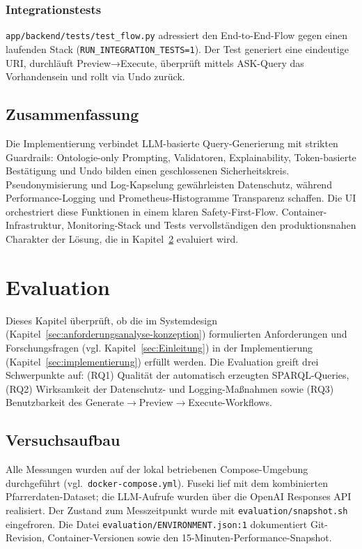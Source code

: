 \subsection{Integrationstests}
\texttt{app/backend/tests/test\_flow.py} adressiert den End-to-End-Flow gegen einen laufenden Stack (\texttt{RUN\_INTEGRATION\_TESTS=1}). Der Test generiert eine eindeutige URI, durchläuft Preview→Execute, überprüft mittels ASK-Query das Vorhandensein und rollt via Undo zurück.

\section{Zusammenfassung}
Die Implementierung verbindet LLM-basierte Query-Generierung mit strikten Guardrails: Ontologie-only Prompting, Validatoren, Explainability, Token-basierte Bestätigung und Undo bilden einen geschlossenen Sicherheitskreis. Pseudonymisierung und Log-Kapselung gewährleisten Datenschutz, während Performance-Logging und Prometheus-Histogramme Transparenz schaffen. Die UI orchestriert diese Funktionen in einem klaren Safety-First-Flow. Container-Infrastruktur, Monitoring-Stack und Tests vervollständigen den produktionsnahen Charakter der Lösung, die in Kapitel~\ref{sec:evaluation} evaluiert wird.






\chapter{Evaluation}
\label{sec:evaluation}

Dieses Kapitel überprüft, ob die im Systemdesign (Kapitel~\ref{sec:anforderungsanalyse-konzeption}) formulierten Anforderungen und Forschungsfragen (vgl. Kapitel~\ref{sec:Einleitung}) in der Implementierung (Kapitel~\ref{sec:implementierung}) erfüllt werden. Die Evaluation greift drei Schwerpunkte auf: (RQ1) Qualität der automatisch erzeugten SPARQL-Queries, (RQ2) Wirksamkeit der Datenschutz- und Logging-Maßnahmen sowie (RQ3) Benutzbarkeit des Generate$\rightarrow$Preview$\rightarrow$Execute-Workflows.

\section{Versuchsaufbau}

Alle Messungen wurden auf der lokal betriebenen Compose-Umgebung durchgeführt (vgl.\ \texttt{docker-compose.yml}). Fuseki lief mit dem kombinierten Pfarrerdaten-Dataset; die LLM-Aufrufe wurden über die OpenAI Responses API realisiert. Der Zustand zum Messzeitpunkt wurde mit \texttt{evaluation/snapshot.sh} eingefroren. Die Datei \texttt{evaluation/ENVIRONMENT.json:1} dokumentiert Git-Revision, Container-Versionen sowie den 15-Minuten-Performance-Snapshot.

